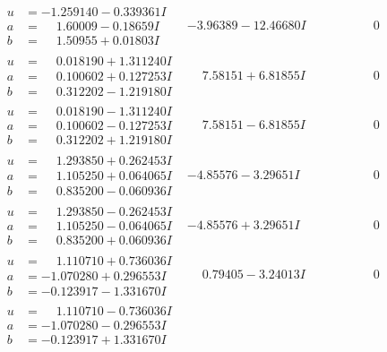\documentclass[1p]{elsarticle_modified}
\theoremstyle{definition}
\begin{document}
$$\begin{array}{c|c|c}
\begin{aligned}
u &= -1.259140 - 0.339361 I \\
a &= \phantom{-}1.60009 - 0.18659 I \\
b &= \phantom{-}1.50955 + 0.01803 I\end{aligned}
 & -3.96389 - 12.46680 I & \phantom{-0.000000 } 0 \\ \hline\begin{aligned}
u &= \phantom{-}0.018190 + 1.311240 I \\
a &= \phantom{-}0.100602 + 0.127253 I \\
b &= \phantom{-}0.312202 - 1.219180 I\end{aligned}
 & \phantom{-}7.58151 + 6.81855 I & \phantom{-0.000000 } 0 \\ \hline\begin{aligned}
u &= \phantom{-}0.018190 - 1.311240 I \\
a &= \phantom{-}0.100602 - 0.127253 I \\
b &= \phantom{-}0.312202 + 1.219180 I\end{aligned}
 & \phantom{-}7.58151 - 6.81855 I & \phantom{-0.000000 } 0 \\ \hline\begin{aligned}
u &= \phantom{-}1.293850 + 0.262453 I \\
a &= \phantom{-}1.105250 + 0.064065 I \\
b &= \phantom{-}0.835200 - 0.060936 I\end{aligned}
 & -4.85576 - 3.29651 I & \phantom{-0.000000 } 0 \\ \hline\begin{aligned}
u &= \phantom{-}1.293850 - 0.262453 I \\
a &= \phantom{-}1.105250 - 0.064065 I \\
b &= \phantom{-}0.835200 + 0.060936 I\end{aligned}
 & -4.85576 + 3.29651 I & \phantom{-0.000000 } 0 \\ \hline\begin{aligned}
u &= \phantom{-}1.110710 + 0.736036 I \\
a &= -1.070280 + 0.296553 I \\
b &= -0.123917 - 1.331670 I\end{aligned}
 & \phantom{-}0.79405 - 3.24013 I & \phantom{-0.000000 } 0 \\ \hline\begin{aligned}
u &= \phantom{-}1.110710 - 0.736036 I \\
a &= -1.070280 - 0.296553 I \\
b &= -0.123917 + 1.331670 I\end{aligned}

\end{array}$$
\end{document}
